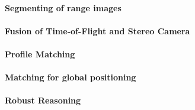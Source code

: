 \paragraph{Segmenting of range images}

\paragraph{Fusion of Time-of-Flight and Stereo Camera}

\paragraph{Profile Matching}

\paragraph{Matching for global positioning}

\paragraph{Robust Reasoning}



